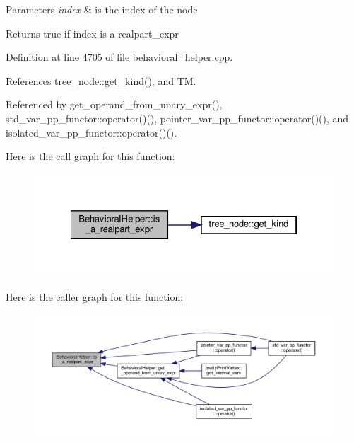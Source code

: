 \begin{DoxyParams}{Parameters}
{\em index} & is the index of the node \\
\hline
\end{DoxyParams}
\begin{DoxyReturn}{Returns}
true if index is a realpart\+\_\+expr 
\end{DoxyReturn}


Definition at line 4705 of file behavioral\+\_\+helper.\+cpp.



References tree\+\_\+node\+::get\+\_\+kind(), and TM.



Referenced by get\+\_\+operand\+\_\+from\+\_\+unary\+\_\+expr(), std\+\_\+var\+\_\+pp\+\_\+functor\+::operator()(), pointer\+\_\+var\+\_\+pp\+\_\+functor\+::operator()(), and isolated\+\_\+var\+\_\+pp\+\_\+functor\+::operator()().

Here is the call graph for this function\+:
\nopagebreak
\begin{figure}[H]
\begin{center}
\leavevmode
\includegraphics[width=322pt]{dd/db2/classBehavioralHelper_adeb3d0584527e099e99da968a854b2d3_cgraph}
\end{center}
\end{figure}
Here is the caller graph for this function\+:
\nopagebreak
\begin{figure}[H]
\begin{center}
\leavevmode
\includegraphics[width=350pt]{dd/db2/classBehavioralHelper_adeb3d0584527e099e99da968a854b2d3_icgraph}
\end{center}
\end{figure}
\mbox{\label{classBehavioralHelper_a200f529a344b5d04ed741e06e542862f}} 

